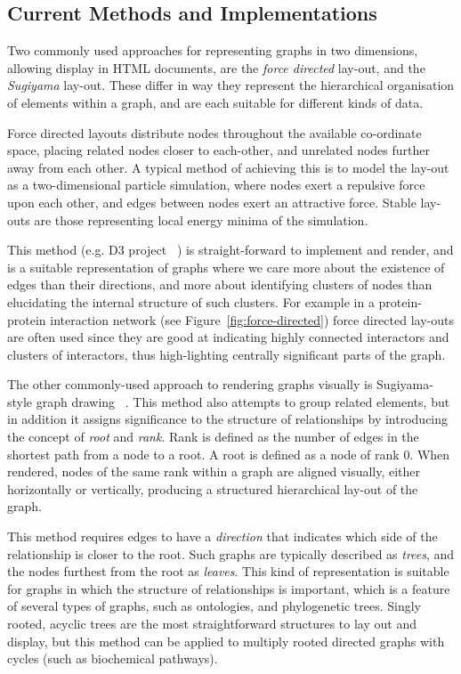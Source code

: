 \documentclass[10pt,a4paper,twocolumn]{article}
\begin{document}
\subsection*{Current Methods and Implementations}

Two commonly used approaches for representing graphs in two dimensions, allowing display in HTML documents, are the \emph{force 
directed} lay-out, and the \emph{Sugiyama} lay-out. These differ in way they
represent the hierarchical organisation of elements within a graph, and are
each suitable for different kinds of data.

Force directed layouts distribute nodes throughout the available co-ordinate
space, placing related nodes closer to each-other, and unrelated nodes further
away from each other. A typical method of achieving this is to model the lay-out
as a two-dimensional particle simulation, where nodes exert a repulsive force
upon each other, and edges between nodes exert an attractive force. Stable lay-outs
are those representing local energy minima of the simulation. 


This method (e.g. D3 project ~\cite{d3})
is straight-forward to implement and render, and is a suitable representation of
graphs where we care more about the existence of edges than their directions, and
more about identifying clusters of nodes than elucidating the internal structure
of such clusters. For example in a protein-protein interaction
network (see Figure~\ref{fig:force-directed}) force directed lay-outs are often used
since they are good at indicating highly connected interactors and clusters of
interactors, thus high-lighting centrally significant parts of the graph. 

The other commonly-used approach to rendering graphs visually is Sugiyama-style 
graph drawing ~\cite{sugiyama}. This method also attempts to group related
elements, but in addition it assigns significance to the structure of relationships by
introducing the concept of \emph{root} and \emph{rank}. Rank is
defined as the number of edges in the shortest path from a node to a root. A root
is defined as a node of rank 0. When rendered, nodes of the same rank within a graph
are aligned visually, either horizontally or vertically, producing a structured
hierarchical lay-out of the graph.

This method requires edges to have a \emph{direction} that indicates which
side of the relationship is closer to the root. Such graphs are typically described
as \emph{trees}, and the nodes furthest from the root as \emph{leaves}.
This kind of representation is suitable
for graphs in which the structure of relationships is important, which is a feature
of several types of graphs, such as ontologies, and phylogenetic trees. Singly rooted, acyclic trees are the most straightforward structures
to lay out and display, but this method can be applied to multiply rooted directed
graphs with cycles (such as biochemical pathways). 
\end{document}
